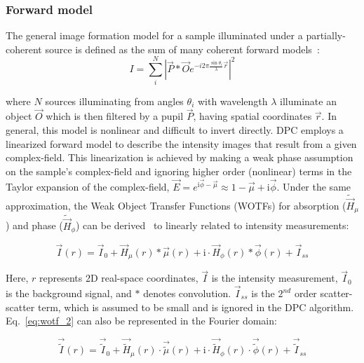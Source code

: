\subsubsection{Forward model}
\label{sec:forward}
The general image formation model for a sample illuminated under a partially-coherent source is defined as the sum of many coherent forward models~\cite{mehta2009quantitative}:
\begin{equation}
I = \sum_i^N |\vec{P} * \vec{O}e^{-i2\pi \frac{\sin{\theta}_i}{\lambda} \vec{r}}|^2
\end{equation}

\noindent where $N$ sources illuminating from angles $\theta_i$ with wavelength $\lambda$ illuminate an object $\vec{O}$ which is then
 filtered by a pupil $\vec{P}$, having spatial coordinates $\vec{r}$. In general, this model is nonlinear and difficult to invert directly. DPC employs a linearized forward model to describe the intensity images that result from a given complex-field. This linearization is achieved by making a weak phase assumption on the sample's complex-field and ignoring higher order (nonlinear) terms in the Taylor expansion of the complex-field, $\vec{E} = e^{\mathrm{i}\vec{\phi} -\vec{\mu}} \approx 1 - \vec{\mu} + \mathrm{i}\vec{\phi}$.
Under the same approximation, the Weak Object Transfer Functions (WOTFs) for absorption ($\tilde{\vec{H}}_{\mu}$) and phase ($\tilde{\vec{H}}_{\phi}$) can be derived~\cite{Claus2015, tian2015quantitative, Hamilton1984a} to linearly related to intensity measurements:

\begin{equation}
	\vec{I}(r) = \vec{I}_{0} +\vec{H}_{\mu}(r) * \vec{\mu}(r) + \mathrm{i}\cdot \vec{H}_{\phi}(r) * \vec{\phi}(r) + \vec{I}_{ss}
	\label{eq:wotf_2}
\end{equation}

\noindent Here, $r$ represents 2D real-space coordinates, $\vec{I}$ is the intensity measurement, $\vec{I}_0$ is the background signal, and $*$ denotes convolution. $\vec{I}_{ss}$ is the $2^{nd}$ order scatter-scatter term, which is assumed to be small and is ignored in the DPC algorithm. Eq.~\ref{eq:wotf_2} can also be represented in the Fourier domain:

\begin{equation}
	\vec{\tilde{I}}(r) = \vec{\tilde{I}}_{0} + \vec{\tilde{H}}_{\mu}(r) \cdot \vec{\tilde{\mu}}(r) + \mathrm{i}\cdot \vec{\tilde{H}}_{\phi}(r) \cdot \vec{\tilde{\phi}}(r) + \vec{\tilde{I}}_{ss}
	\label{eq:wotf_2_f}
\end{equation}

